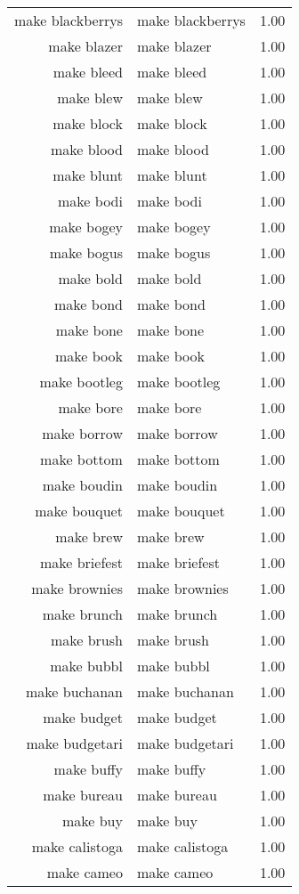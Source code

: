 \begin{table}[ht]
\begin{tabular}{rlr}
  make blackberrys & make blackberrys & 1.00 \\ 
  make blazer & make blazer & 1.00 \\ 
  make bleed & make bleed & 1.00 \\ 
  make blew & make blew & 1.00 \\ 
  make block & make block & 1.00 \\ 
  make blood & make blood & 1.00 \\ 
  make blunt & make blunt & 1.00 \\ 
  make bodi & make bodi & 1.00 \\ 
  make bogey & make bogey & 1.00 \\ 
  make bogus & make bogus & 1.00 \\ 
  make bold & make bold & 1.00 \\ 
  make bond & make bond & 1.00 \\ 
  make bone & make bone & 1.00 \\ 
  make book & make book & 1.00 \\ 
  make bootleg & make bootleg & 1.00 \\ 
  make bore & make bore & 1.00 \\ 
  make borrow & make borrow & 1.00 \\ 
  make bottom & make bottom & 1.00 \\ 
  make boudin & make boudin & 1.00 \\ 
  make bouquet & make bouquet & 1.00 \\ 
  make brew & make brew & 1.00 \\ 
  make briefest & make briefest & 1.00 \\ 
  make brownies & make brownies & 1.00 \\ 
  make brunch & make brunch & 1.00 \\ 
  make brush & make brush & 1.00 \\ 
  make bubbl & make bubbl & 1.00 \\ 
  make buchanan & make buchanan & 1.00 \\ 
  make budget & make budget & 1.00 \\ 
  make budgetari & make budgetari & 1.00 \\ 
  make buffy & make buffy & 1.00 \\ 
  make bureau & make bureau & 1.00 \\ 
  make buy & make buy & 1.00 \\ 
  make calistoga & make calistoga & 1.00 \\ 
  make cameo & make cameo & 1.00 \\ 

\end{tabular}
\end{table}
